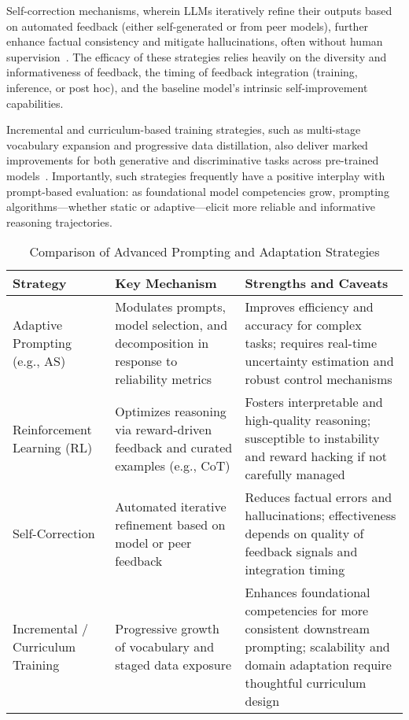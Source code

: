 Self-correction mechanisms, wherein LLMs iteratively refine their outputs based on automated feedback (either self-generated or from peer models), further enhance factual consistency and mitigate hallucinations, often without human supervision~\cite{ref68}. The efficacy of these strategies relies heavily on the diversity and informativeness of feedback, the timing of feedback integration (training, inference, or post hoc), and the baseline model's intrinsic self-improvement capabilities.

Incremental and curriculum-based training strategies, such as multi-stage vocabulary expansion and progressive data distillation, also deliver marked improvements for both generative and discriminative tasks across pre-trained models~\cite{ref49}. Importantly, such strategies frequently have a positive interplay with prompt-based evaluation: as foundational model competencies grow, prompting algorithms---whether static or adaptive---elicit more reliable and informative reasoning trajectories.

\begin{table*}[htbp]
\centering
\caption{Comparison of Advanced Prompting and Adaptation Strategies}
\label{tab:prompt_adaptation_comparison}
\begin{adjustbox}{max width=\textwidth}
\begin{tabular}{lll}
\toprule
\textbf{Strategy} & \textbf{Key Mechanism} & \textbf{Strengths and Caveats} \\
\midrule
Adaptive Prompting (e.g., AS) & Modulates prompts, model selection, and decomposition in response to reliability metrics & Improves efficiency and accuracy for complex tasks; requires real-time uncertainty estimation and robust control mechanisms \\
Reinforcement Learning (RL) & Optimizes reasoning via reward-driven feedback and curated examples (e.g., CoT) & Fosters interpretable and high-quality reasoning; susceptible to instability and reward hacking if not carefully managed \\
Self-Correction & Automated iterative refinement based on model or peer feedback & Reduces factual errors and hallucinations; effectiveness depends on quality of feedback signals and integration timing \\
Incremental / Curriculum Training & Progressive growth of vocabulary and staged data exposure & Enhances foundational competencies for more consistent downstream prompting; scalability and domain adaptation require thoughtful curriculum design \\
\bottomrule
\end{tabular}
\end{adjustbox}
\end{table*}

